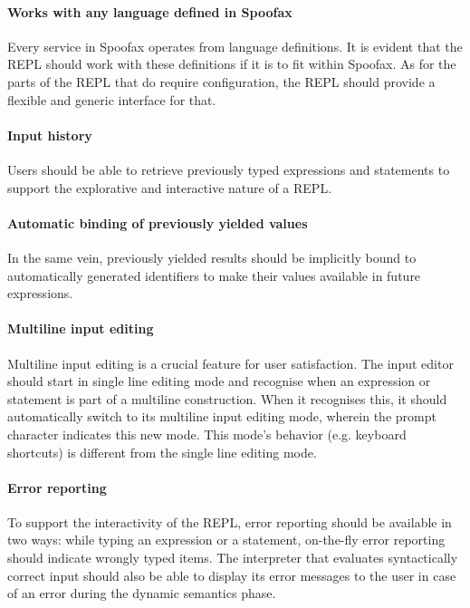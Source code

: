 \paragraph{Works with any language defined in Spoofax} Every service
in Spoofax operates from language definitions. It is evident that the
REPL should work with these definitions if it is to fit within
Spoofax. As for the parts of the REPL that do require configuration,
the REPL should provide a flexible and generic interface for that.

\paragraph{Input history} Users should be able to retrieve previously
typed expressions and statements to support the explorative and interactive
nature of a REPL.

\paragraph{Automatic binding of previously yielded values} In the same vein,
previously yielded results should be implicitly bound to automatically generated
identifiers to make their values available in future expressions.

\paragraph{Multiline input editing} Multiline input editing is a crucial feature
for user satisfaction. The input editor should start in single line editing mode
and recognise when an expression or statement is part of a multiline
construction. When it recognises this, it should automatically switch to its
multiline input editing mode, wherein the prompt character indicates this new
mode. This mode's behavior (e.g. keyboard shortcuts) is different from the
single line editing mode.

\paragraph{Error reporting} To support the interactivity of the REPL, error
reporting should be available in two ways: while typing an expression or a
statement, on-the-fly error reporting should indicate wrongly typed items. The
interpreter that evaluates syntactically correct input should also be able to
display its error messages to the user in case of an error during the dynamic
semantics phase.

